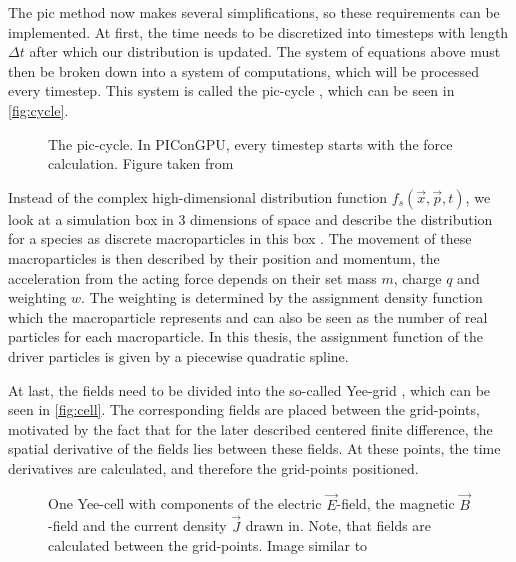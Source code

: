 \documentclass[bachelor_thesis]{subfiles}
\begin{document}
The \gls{pic} method now makes several simplifications, so these requirements can be implemented.
At first, the time needs to be discretized into timesteps with length $\Delta t$ after which our distribution is updated. The system of equations above must then be broken down into a system of computations, which will be processed every timestep.
This system is called the \gls{pic}-cycle \cite{Huebl2019}, which can be seen in \autoref{fig:cycle}.

\begin{figure}
	\centering
	\resizebox{0.8\textwidth}{!}{}
	\caption{The \gls{pic}-cycle. In PIConGPU, every timestep starts with the force calculation. Figure taken from \cite{Pausch2019}}
	\label{fig:cycle}
\end{figure}

Instead of the complex high-dimensional distribution function $f_s(\vec{x}, \vec{p}, t)$, we look at a simulation box in 3 dimensions of space and describe the distribution for a species as discrete macroparticles in this box \cite{Burau2010}.
The movement of these macroparticles is then described by their position and momentum, the acceleration from the acting force depends on their set mass $m$, charge $q$ and weighting $w$.
The weighting is determined by the assignment density function which the macroparticle represents and can also be seen as the number of real particles for each macroparticle.
In this thesis, the assignment function of the driver particles is given by a piecewise quadratic spline.

At last, the fields need to be divided into the so-called Yee-grid \cite{Yee1966}, which can be seen in \autoref{fig:cell}. The corresponding fields are placed between the grid-points, motivated by the fact that for the later described centered finite difference, 
the spatial derivative of the fields lies between these fields. At these points, the time derivatives are calculated, and therefore the grid-points positioned.

\begin{figure}
	\centering
	\resizebox{0.8\textwidth}{!}{}
	\caption{One Yee-cell with components of the electric $\vec{E}$-field, the magnetic $\vec{B}$-field and the current density $\vec{J}$ drawn in. Note, that fields are calculated between the grid-points. Image similar to \cite{PICRepo}}
	\label{fig:cell}
\end{figure}
\end{document}
